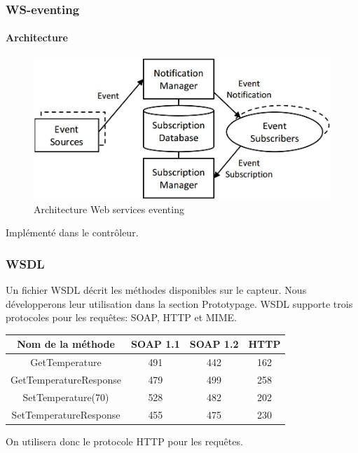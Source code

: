 \begin{frame}
 \frametitle{WS-eventing}
 \framesubtitle{Architecture}
 \begin{figure}
  \centering
  \includegraphics[scale=0.43]{figures/eventing.jpg}
  \caption{Architecture Web services eventing}
 \end{figure}
 Implémenté dans le contrôleur.
\end{frame}
\begin{frame}
 \frametitle{WSDL}
 Un fichier WSDL décrit les méthodes disponibles sur le capteur. Nous développerons leur utilisation dans la section Prototypage.
 WSDL supporte trois protocoles pour les requêtes: SOAP, HTTP et MIME.\\
 \vspace{5mm}
 \begin{center}
 \begin{tabular}{|c|c|c|c|}
 \hline
 Nom de la méthode & SOAP 1.1 & SOAP 1.2 & HTTP\\
 \hline
 GetTemperature & 491 & 442 & 162\\
 GetTemperatureResponse & 479 & 499 & 258\\
 SetTemperature(70) & 528 & 482 & 202\\
 SetTemperatureResponse & 455 & 475 & 230\\
 \hline
 \end{tabular}
 \end{center}
 \vspace{5mm}
 On utilisera donc le protocole HTTP pour les requêtes.
\end{frame}

